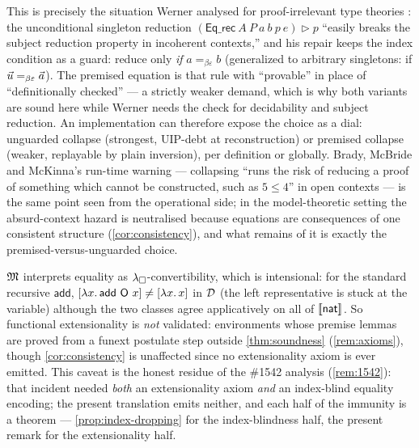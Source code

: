 This is precisely the situation Werner analysed for proof-irrelevant
type theories \cite{Werner2008}: the unconditional singleton reduction
$(\mathsf{Eq\_rec}\ A\ P\ a\ b\ p\ e) \rhd p$ ``easily breaks the
subject reduction property in incoherent contexts,'' and his repair
keeps the index condition as a guard: reduce only \emph{if} $a
=_{\beta\varepsilon} b$ (generalized to arbitrary singletons: if
$\vec{u} =_{\beta\varepsilon} \vec{a}$).  The premised equation is that
rule with ``provable'' in place of ``definitionally checked'' --- a
strictly weaker demand, which is why both variants are sound here while
Werner needs the check for decidability and subject reduction.  An
implementation can therefore expose the choice as a dial: unguarded
collapse (strongest, UIP-debt at reconstruction) or premised collapse
(weaker, replayable by plain inversion), per definition or globally.
Brady, McBride and McKinna's run-time warning --- collapsing ``runs the
risk of reducing a proof of something which cannot be constructed, such
as $5 \le 4$'' in open contexts \cite{BradyEtAl2004} --- is the same
point seen from the operational side; in the model-theoretic setting
the absurd-context hazard is neutralised because equations are
consequences of one consistent structure (\cref{cor:consistency}), and
what remains of it is exactly the premised-versus-unguarded choice.

\begin{remark}
\label{rem:funext-leak}
$\mathfrak{M}$ interprets equality as $\lambda_{\square}$-convertibility, which is
intensional: for the standard recursive $\mathsf{add}$,
$[\lambda x.\,\mathsf{add}\ \mathsf{O}\ x] \neq [\lambda x.\,x]$ in
$\mathcal{D}$ (the left representative is stuck at the variable) although the
two classes agree applicatively on all of $[\![ \mathsf{nat} ]\!]_{}$.  So functional extensionality is \emph{not} validated:
environments whose premise lemmas are proved from a funext postulate
step outside \cref{thm:soundness} (\cref{rem:axioms}), though
\cref{cor:consistency} is unaffected since no extensionality axiom is
ever emitted.  This caveat is the honest residue of the \fstar{}
\#1542 analysis (\cref{rem:1542}): that incident needed \emph{both} an
extensionality axiom \emph{and} an index-blind equality encoding; the
present translation emits neither, and each half of the immunity is a
theorem --- \cref{prop:index-dropping} for the index-blindness half,
the present remark for the extensionality half.
\end{remark}
